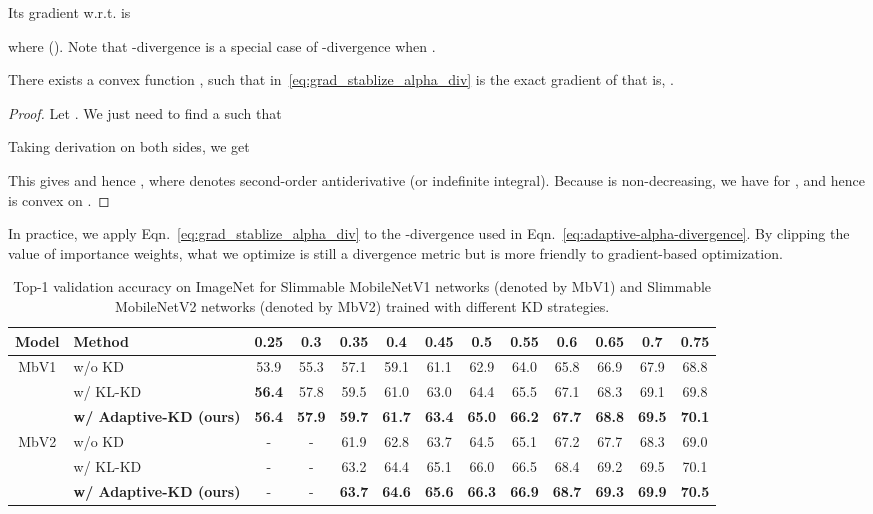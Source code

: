 \documentclass{article}
\begin{document}
Its gradient w.r.t.  is 

where  (\citet{wang2018variational}). 
Note that -divergence is a special case of -divergence when 
. 

\begin{pro}
There exists a convex function , such that 
 in~\eqref{eq:grad_stablize_alpha_div} is the exact gradient of  that is, 
. 
\end{pro}
\begin{proof}
Let . 
We just need to find a  such that 

Taking derivation on both sides, we get 

This gives  
and hence ,
where   denotes second-order antiderivative (or indefinite integral). 
Because  is non-decreasing, 
we have  for , and hence  is convex on . 
\end{proof}

In practice, we apply Eqn.~\eqref{eq:grad_stablize_alpha_div} to the -divergence used in Eqn.~\eqref{eq:adaptive-alpha-divergence}.
By clipping the value of importance weights, what we optimize is still a divergence metric but is more friendly to gradient-based optimization. 

 


\begin{table*}[ht]
\centering
\setlength{\tabcolsep}{4pt}
\begin{tabular}{c|l|ccccccccccc}
\hline
Model & Method & 0.25 &  0.3  &  0.35  &  0.4  &  0.45  & 0.5  &  0.55   &  0.6  & 0.65 & 0.7 & 0.75\\
\hline
\hline
\multirow{3}{*}{MbV1} & w/o KD & 53.9 & 55.3 & 57.1 & 59.1 & 61.1 & 62.9 & 64.0 & 65.8 & 66.9 & 67.9 & 68.8 \\  
&w/ KL-KD  &  \bf 56.4  & 57.8 & 59.5 & 61.0 & 63.0 & 64.4 & 65.5 & 67.1 & 68.3 & 69.1 & 69.8 \\
& \bf w/ Adaptive-KD  (ours) & \bf 56.4 & \bf 57.9 & \bf  59.7 &  \bf 61.7 & \bf  63.4 &  \bf 65.0 &  \bf 66.2 &  \bf 67.7 &  \bf 68.8 &  \bf 69.5 &  \bf 70.1\\ \hline \hline 
\multirow{3}{*}{MbV2} &  w/o KD & - & - & 61.9 & 62.8 & 63.7 & 64.5 & 65.1 & 67.2 & 67.7 & 68.3 & 69.0 \\
& w/ KL-KD  &  - & - &63.2 & 64.4 & 65.1 & 66.0 & 66.5 & 68.4 & 69.2 & 69.5 & 70.1  \\
& \bf  w/ Adaptive-KD  (ours) &  - & - & \bf 63.7 & \bf64.6 &\bf 65.6 & \bf66.3 &\bf 66.9 & \bf68.7 &\bf 69.3 &\bf 69.9 & \bf70.5 \\ \hline 
\end{tabular}
\caption{Top-1 validation accuracy on ImageNet for Slimmable MobileNetV1 networks (denoted by MbV1) and Slimmable MobileNetV2 networks (denoted by MbV2) 
trained with different KD strategies.}
\label{tab:slimmbale}
\end{table*}
\end{document}
